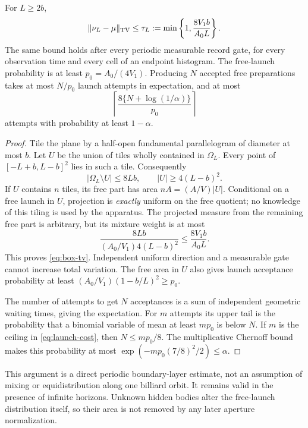 \begin{proposition}\label{prop:box}
For $L\ge2b$,
\begin{equation}\label{eq:box-tv}
 \|\nu_L-\mu\|_{\rm TV}\le
 \tau_L:=\min\left\{1,\frac{8V_1b}{A_0L}\right\}.
\end{equation}
The same bound holds after every periodic measurable record gate, for
every observation time and every cell of an endpoint histogram. The
free-launch probability is at least $p_0=A_0/(4V_1)$. Producing $N$
accepted free preparations takes at most $N/p_0$ launch attempts in
expectation, and at most
\begin{equation}\label{eq:launch-cost}
 \left\lceil\frac{8\{N+\log(1/\alpha)\}}{p_0}\right\rceil
\end{equation}
attempts with probability at least $1-\alpha$.
\end{proposition}
\begin{proof}
Tile the plane by a half-open fundamental parallelogram of diameter at
most $b$. Let $U$ be the union of tiles wholly contained in $\Omega_L$.
Every point of $[-L+b,L-b]^2$ lies in such a tile. Consequently
\[
 |\Omega_L\setminus U|\le8Lb,\qquad |U|\ge4(L-b)^2.
\]
If $U$ contains $n$ tiles, its free part has area $nA=(A/V)|U|$.
Conditional on a free launch in $U$, projection is \emph{exactly}
uniform on the free quotient; no knowledge of this tiling is used by
the apparatus. The projected measure from the remaining free part is
arbitrary, but its mixture weight is at most
\[
 \frac{8Lb}{(A_0/V_1)4(L-b)^2}\le\frac{8V_1b}{A_0L}.
\]
This proves \eqref{eq:box-tv}. Independent uniform direction and a
measurable gate cannot increase total variation. The free area in $U$
also gives launch acceptance probability at least
$(A_0/V_1)(1-b/L)^2\ge p_0$.

The number of attempts to get $N$ acceptances is a sum of independent
geometric waiting times, giving the expectation. For $m$ attempts its
upper tail is the probability that a binomial variable of mean at least
$mp_0$ is below $N$. If $m$ is the ceiling in \eqref{eq:launch-cost},
then $N\le mp_0/8$. The multiplicative Chernoff bound makes this
probability at most $\exp(-mp_0(7/8)^2/2)\le\alpha$.
\end{proof}

This argument is a direct periodic boundary-layer estimate, not an
assumption of mixing or equidistribution along one billiard orbit. It
remains valid in the presence of infinite horizons. Unknown hidden
bodies alter the free-launch distribution itself, so their area is not
removed by any later aperture normalization.

